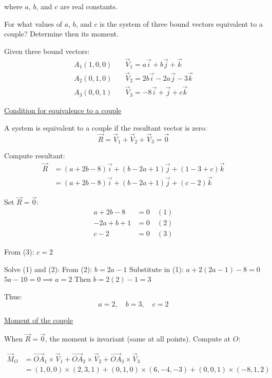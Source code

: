 \documentclass[12pt]{article}
\begin{document}
where $a$, $b$, and $c$ are real constants.

For what values of $a$, $b$, and $c$ is the system of three bound vectors equivalent to a couple? Determine then its moment.

\begin{correctionbox}
Given three bound vectors:
\begin{align*}
A_1(1,0,0) & \quad \vec{V}_1 = a\vec{i} + b\vec{j} + \vec{k} \\
A_2(0,1,0) & \quad \vec{V}_2 = 2b\vec{i} - 2a\vec{j} - 3\vec{k} \\
A_3(0,0,1) & \quad \vec{V}_3 = -8\vec{i} + \vec{j} + c\vec{k}
\end{align*}

\underline{Condition for equivalence to a couple}

A system is equivalent to a couple if the resultant vector is zero:
\[
\vec{R} = \vec{V}_1 + \vec{V}_2 + \vec{V}_3 = \vec{0}
\]

Compute resultant:
\begin{align*}
\vec{R} &= (a + 2b - 8)\vec{i} + (b - 2a + 1)\vec{j} + (1 - 3 + c)\vec{k} \\
&= (a + 2b - 8)\vec{i} + (b - 2a + 1)\vec{j} + (c - 2)\vec{k}
\end{align*}

Set $\vec{R} = \vec{0}$:
\begin{align*}
a + 2b - 8 &= 0 \quad (1) \\
-2a + b + 1 &= 0 \quad (2) \\
c - 2 &= 0 \quad (3)
\end{align*}

From (3): $\boxed{c = 2}$

Solve (1) and (2):
From (2): $b = 2a - 1$
Substitute in (1): $a + 2(2a - 1) - 8 = 0$
$5a - 10 = 0 \implies a = 2$
Then $b = 2(2) - 1 = 3$

Thus:
\[
\boxed{a = 2, \quad b = 3, \quad c = 2}
\]

\underline{Moment of the couple}

When $\vec{R} = \vec{0}$, the moment is invariant (same at all points). Compute at $O$:

\begin{align*}
\vec{M}_O &= \vec{OA}_1 \times \vec{V}_1 + \vec{OA}_2 \times \vec{V}_2 + \vec{OA}_3 \times \vec{V}_3 \\
&= (1,0,0) \times (2,3,1) + (0,1,0) \times (6,-4,-3) + (0,0,1) \times (-8,1,2)
\end{align*}


\end{correctionbox}
\end{document}

